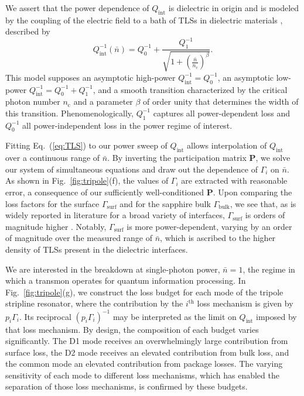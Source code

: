 \documentclass[
    reprint,
    superscriptaddress,
    amsmath,amssymb,
    aps,
    prb,
    floatfix,
]{revtex4-2}
\begin{document}
We assert that the power dependence of $Q_\mathrm{int}$ is dielectric in origin and is modeled by the coupling of the electric field to a bath of TLSs in dielectric materials \cite{gao2008,pappas2011}, described by
\begin{equation}
    Q_\mathrm{int}^{-1}\left(\bar{n}\right)= Q_0^{-1}+\frac{Q_1^{-1}}{\sqrt{1+\left(\frac{\bar{n}}{n_\mathrm{c}}\right)^\beta}}.
    \label{eq:TLS}
\end{equation}
This model supposes an asymptotic high-power $Q_\mathrm{int}^{-1}=Q_0^{-1}$, an asymptotic low-power $Q_\mathrm{int}^{-1}=Q_0^{-1}+Q_1^{-1}$, and a smooth transition characterized by the critical photon number $n_\mathrm{c}$ and a parameter $\beta$ of order unity that determines the width of this transition. Phenomenologically, $Q_1^{-1}$ captures all power-dependent loss and $Q_0^{-1}$ all power-independent loss in the power regime of interest.

Fitting Eq.~(\ref{eq:TLS}) to our power sweep of $Q_\mathrm{int}$ allows interpolation of $Q_\mathrm{int}$ over a continuous range of $\bar{n}$. By inverting the participation matrix $\mathbf{P}$, we solve our system of simultaneous equations and draw out the dependence of $\Gamma_i$ on $\bar{n}$. As shown in Fig.~\ref{fig:tripole}(f), the values of $\Gamma_i$ are extracted with reasonable error, a consequence of our sufficiently well-conditioned $\mathbf{P}$. Upon comparing the loss factors for the surface $\Gamma_\mathrm{surf}$ and for the sapphire bulk $\Gamma_\mathrm{bulk}$, we see that, as is widely reported in literature for a broad variety of interfaces, $\Gamma_\mathrm{surf}$ is orders of magnitude higher \cite{creedon2011,woods2019,melville2020,read2023,crowley2023,ganjam2024,bland2025}. Notably, $\Gamma_\mathrm{surf}$ is more power-dependent, varying by an order of magnitude over the measured range of $\bar{n}$, which is ascribed to the higher density of TLSs present in the dielectric interfaces.

We are interested in the breakdown at single-photon power, $\bar{n}=1$, the regime in which a transmon operates for quantum information processing. In Fig.~\ref{fig:tripole}(g), we construct the loss budget for each mode of the tripole stripline resonator, where the contribution by the $i^\mathrm{th}$ loss mechanism is given by $p_i\Gamma_i$. Its reciprocal $\left(p_i\Gamma_i\right)^{-1}$ may be interpreted as the limit on $Q_\mathrm{int}$ imposed by that loss mechanism. By design, the composition of each budget varies significantly. The D1 mode receives an overwhelmingly large contribution from surface loss, the D2 mode receives an elevated contribution from bulk loss, and the common mode an elevated contribution from package losses. The varying sensitivity of each mode to different loss mechanisms, which has enabled the separation of those loss mechanisms, is confirmed by these budgets.
\end{document}
